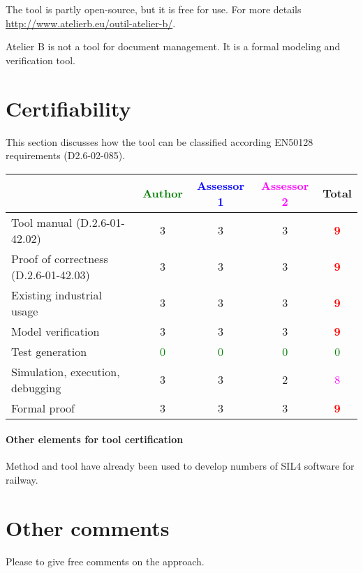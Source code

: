 \begin{author_comment}
The tool is partly open-source, but it is free for use.
For more details \url{http://www.atelierb.eu/outil-atelier-b/}.
\end{author_comment}


\begin{assessor2}
Atelier B is not a tool for document management. It is a formal modeling and verification tool.
\end{assessor2}

\section{Certifiability}

This section discusses how the tool can be classified according EN50128 requirements (D2.6-02-085).


\begin{tabular}{|l | c | c | c | c|}
\hline
& \textcolor{green}{Author} & \textcolor{blue}{Assessor 1} & \textcolor{magenta}{Assessor 2} & Total \\
\hline 
Tool manual (D.2.6-01-42.02) & 3    & 3    & 3    & \textcolor{red}{\textbf{9}} \\
\hline
Proof of correctness (D.2.6-01-42.03)   & 3    & 3    & 3    & \textcolor{red}{\textbf{9}} \\
\hline
Existing industrial  usage  & 3     & 3    & 3    & \textcolor{red}{\textbf{9}} \\
\hline
Model verification & 3    & 3    & 3    & \textcolor{red}{\textbf{9}} \\
\hline
Test generation & \textcolor{green}{0} & \textcolor{green}{0} & \textcolor{green}{0} & \textcolor{green}{0} \\
\hline
Simulation, execution, debugging & 3    & 3    & 2    & \textcolor{magenta}{8} \\
\hline
Formal proof & 3    & 3    & 3    & \textcolor{red}{\textbf{9}} \\
\hline
\end{tabular}

\paragraph{Other elements for tool certification}


\begin{author_comment}
Method and tool have already been used to  develop numbers of  SIL4 software for railway.
\end{author_comment}


\section{Other comments}
Please to  give free comments on the approach.
